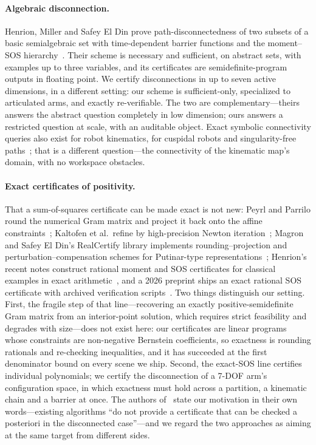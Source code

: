 \documentclass[10pt,twocolumn,letterpaper]{article}
\begin{document}
\paragraph{Algebraic disconnection.} Henrion, Miller and Safey El Din prove path-disconnectedness of two subsets of a basic semialgebraic set with time-dependent barrier functions and the moment--SOS hierarchy~\cite{henrion2024}. Their scheme is necessary and sufficient, on abstract sets, with examples up to three variables, and its certificates are semidefinite-program outputs in floating point. We certify disconnections in up to seven active dimensions, in a different setting: our scheme is sufficient-only, specialized to articulated arms, and exactly re-verifiable. The two are complementary---theirs answers the abstract question completely in low dimension; ours answers a restricted question at scale, with an auditable object. Exact symbolic connectivity queries also exist for robot kinematics, for cuspidal robots and singularity-free paths~\cite{capco2020,capco2023}; that is a different question---the connectivity of the kinematic map's domain, with no workspace obstacles.

\paragraph{Exact certificates of positivity.} That a sum-of-squares certificate can be made exact is not new: Peyrl and Parrilo round the numerical Gram matrix and project it back onto the affine constraints~\cite{peyrl2008}; Kaltofen et al.\ refine by high-precision Newton iteration~\cite{kaltofen2008}; Magron and Safey El Din's RealCertify library implements rounding--projection and perturbation--compensation schemes for Putinar-type representations~\cite{magron2018realcertify,magron2018putinar,magron2021jsc}; Henrion's recent notes construct rational moment and SOS certificates for classical examples in exact arithmetic~\cite{henrion2025notsos,henrion2025stengle}, and a 2026 preprint ships an exact rational SOS certificate with archived verification scripts~\cite{hypercube2026}. Two things distinguish our setting. First, the fragile step of that line---recovering an exactly positive-semidefinite Gram matrix from an interior-point solution, which requires strict feasibility and degrades with size---does not exist here: our certificates are linear programs whose constraints are non-negative Bernstein coefficients, so exactness is rounding rationals and re-checking inequalities, and it has succeeded at the first denominator bound on every scene we ship. Second, the exact-SOS line certifies individual polynomials; we certify the disconnection of a 7-DOF arm's configuration space, in which exactness must hold across a partition, a kinematic chain and a barrier at once. The authors of~\cite{henrion2024} state our motivation in their own words---existing algorithms ``do not provide a certificate that can be checked a posteriori in the disconnected case''---and we regard the two approaches as aiming at the same target from different sides.
\end{document}
